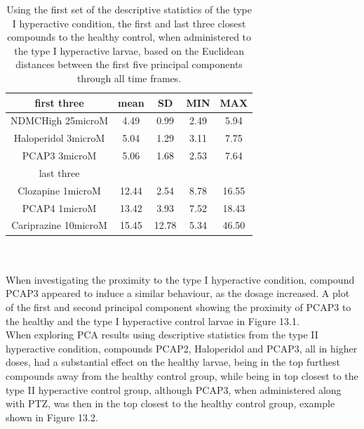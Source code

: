 \documentclass[a4paper,12pt]{article}
\begin{document}
\begin{table}[h!]\tiny
\centering
\begin{tabular}{|c|c|c|c|c|}
\hline
first three          & mean  & SD    & MIN  & MAX   \\ \hline
NDMCHigh 25microM    & 4.49  & 0.99  & 2.49 & 5.94  \\ \hline
Haloperidol 3microM  & 5.04  & 1.29  & 3.11 & 7.75  \\ \hline
PCAP3 3microM      & 5.06  & 1.68  & 2.53 & 7.64  \\ \hline
last three           & \multicolumn{4}{c|}{}        \\ \hline
Clozapine 1microM    & 12.44 & 2.54  & 8.78 & 16.55 \\ \hline
PCAP4 1microM      & 13.42 & 3.93  & 7.52 & 18.43 \\ \hline
Cariprazine 10microM & 15.45 & 12.78 & 5.34 & 46.50  \\ \hline
\end{tabular}
\caption{Using the first set of the descriptive statistics of the type I hyperactive condition, the first and last three closest compounds to the healthy control, when administered to the type I hyperactive larvae, based on the Euclidean distances between the first five principal components through all time frames.}
\end{table}
\\\\When investigating the proximity to the type I hyperactive condition, compound PCAP3 appeared to induce a similar behaviour, as the dosage increased. A plot of the first and second principal component showing the proximity of PCAP3 to the healthy and the type I hyperactive control larvae in Figure 13.1.\\
When exploring PCA results using descriptive statistics from the type II hyperactive condition, compounds PCAP2, Haloperidol and PCAP3, all in higher doses, had a substantial effect on the healthy larvae, being in the top furthest compounds away from the healthy control group, while being in top closest to the type II hyperactive control group, although PCAP3, when administered along with PTZ, was then in the top closest to the healthy control group, example shown in Figure 13.2.
\newpage
\end{document}
